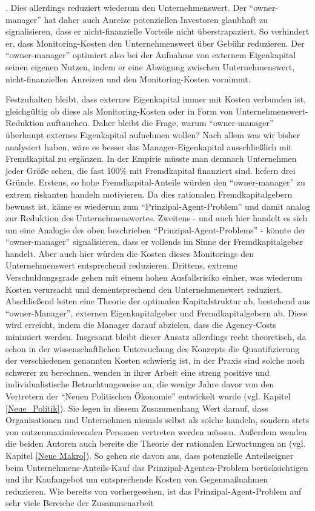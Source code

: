 \parencite[S. 316]{Jensen1976}. Dies allerdings reduziert wiederum den Unternehmenswert. Der "`owner-manager"' hat daher auch Anreize potenziellen Investoren glaubhaft zu signalisieren, dass er nicht-finanzielle Vorteile nicht überstrapaziert. So verhindert er, dass Monitoring-Kosten den Unternehmenswert über Gebühr reduzieren. Der "`owner-manager"' optimiert also bei der Aufnahme von externem Eigenkapital seinen eigenen Nutzen, indem er eine Abwägung zwischen Unternehmenswert, nicht-finanziellen Anreizen und den Monitoring-Kosten vornimmt.

Festzuhalten bleibt, dass externes Eigenkapital immer mit Kosten verbunden ist, gleichgültig ob diese als Monitoring-Kosten oder in Form von Unternehmenswert-Reduktion auftauchen. Daher bleibt die Frage, warum "`owner-manager"' überhaupt externes Eigenkapital aufnehmen wollen? Nach allem was wir bisher analysiert haben, wäre es besser das Manager-Eigenkapital ausschließlich mit Fremdkapital zu ergänzen. In der Empirie müsste man demnach Unternehmen jeder Größe sehen, die fast 100\% mit Fremdkapital finanziert sind. \textcite[S. 345]{Jensen1976} liefern drei Gründe. Erstens, so hohe Fremdkapital-Anteile würden den "`owner-manager"' zu extrem riskanten handeln motivieren. Da dies rationalen Fremdkapitalgebern bewusst ist, käme es wiederum zum "`Prinzipal-Agent-Problem"' und damit analog zur Reduktion des Unternehmenswertes. Zweitens - und auch hier handelt es sich um eine Analogie des oben beschrieben "`Prinzipal-Agent-Problems"' - könnte der "`owner-manager"' signalisieren, dass er vollends im Sinne der Fremdkapitalgeber handelt. Aber auch hier würden die Kosten dieses Monitorings den Unternehmenswert entsprechend reduzieren. Drittens, extreme Verschuldungsgrade gehen mit einem hohen Ausfallsrisiko einher, was wiederum Kosten verursacht und dementsprechend den Unternehmenswert reduziert. Abschließend leiten \textcite{Jensen1976} eine Theorie der optimalen Kapitalstruktur ab, bestehend aus "`owner-Manager"', externen Eigenkapitalgeber und Fremdkapitalgebern ab. Diese wird erreicht, indem die Manager darauf abzielen, dass die Agency-Costs minimiert werden. Insgesamt bleibt dieser Ansatz allerdings recht theoretisch, da schon in der wissenschaftlichen Untersuchung des Konzepts die Quantifizierung der verschiedenen genannten Kosten schwierig ist, in der Praxis sind solche noch schwerer zu berechnen. \textcite{Jensen1976} wenden in ihrer Arbeit eine streng positive und individualistische Betrachtungsweise an, die wenige Jahre davor von den Vertretern der "`Neuen Politischen Ökonomie"' entwickelt wurde (vgl. Kapitel \ref{Neue_Politik}). Sie legen in diesem Zusammenhang Wert darauf, dass Organisationen und Unternehmen niemals selbst als solche handeln, sondern stets von nutzenmaximierenden Personen vertreten werden müssen. Außerdem wenden die beiden Autoren auch bereits die Theorie der rationalen Erwartungen an (vgl. Kapitel \ref{Neue Makro}). So gehen sie davon aus, dass potenzielle Anteilseigner beim Unternehmens-Anteils-Kauf das Prinzipal-Agenten-Problem berücksichtigen und ihr Kaufangebot um entsprechende Kosten von Gegenmaßnahmen reduzieren. Wie bereits von \textcite[S. 311]{Jensen1976} vorhergesehen, ist das Prinzipal-Agent-Problem auf sehr viele Bereiche der Zusammenarbeit 